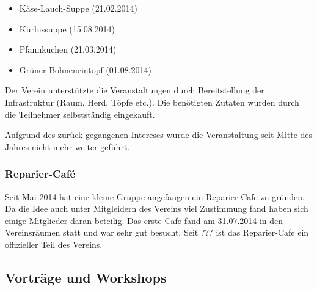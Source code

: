 \documentclass[10pt,DIV16]{scrartcl}
\begin{document}
\begin{itemize}
    \item Käse-Lauch-Suppe (21.02.2014)
    \item Kürbissuppe (15.08.2014)
    \item Pfannkuchen (21.03.2014)
    \item Grüner Bohneneintopf (01.08.2014)
\end{itemize}

Der Verein unterstützte die Veranstaltungen durch Bereitstellung der
Infrastruktur (Raum, Herd, Töpfe etc.). Die benötigten Zutaten wurden
durch die Teilnehmer selbstständig eingekauft. 

Aufgrund des zurück gegangenen Intereses wurde die Veranstaltung seit Mitte des Jahres nicht mehr weiter geführt. 

\subsubsection{Reparier-Café}

Seit Mai 2014 hat eine kleine Gruppe angefangen ein Reparier-Cafe zu gründen. 
Da die Idee auch unter Mitgleidern des Vereins viel Zustimmung fand haben sich einige Mitglieder daran beteilig. 
Das erste Cafe fand am 31.07.2014 in den Vereinsräumen statt und war sehr gut besucht. 
Seit ??? ist das Reparier-Cafe ein offizieller Teil des Vereins. 


\subsection{Vorträge und Workshops}
\end{document}
